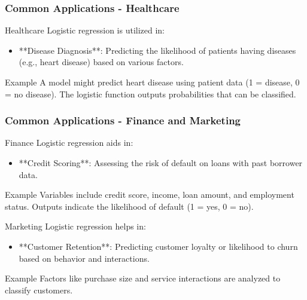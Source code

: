 \documentclass[aspectratio=169]{beamer}
\begin{document}
\begin{frame}[fragile]
    \frametitle{Common Applications - Healthcare}
    \begin{block}{Healthcare}
        Logistic regression is utilized in:
        \begin{itemize}
            \item **Disease Diagnosis**: Predicting the likelihood of patients having diseases (e.g., heart disease) based on various factors.
        \end{itemize}
        \begin{exampleblock}{Example}
            A model might predict heart disease using patient data (1 = disease, 0 = no disease).
            The logistic function outputs probabilities that can be classified.
        \end{exampleblock}
    \end{block}
\end{frame}

\begin{frame}[fragile]
    \frametitle{Common Applications - Finance and Marketing}
    \begin{block}{Finance}
        Logistic regression aids in:
        \begin{itemize}
            \item **Credit Scoring**: Assessing the risk of default on loans with past borrower data.
        \end{itemize}
        \begin{exampleblock}{Example}
            Variables include credit score, income, loan amount, and employment status.
            Outputs indicate the likelihood of default (1 = yes, 0 = no).
        \end{exampleblock}
    \end{block}
    
    \begin{block}{Marketing}
        Logistic regression helps in:
        \begin{itemize}
            \item **Customer Retention**: Predicting customer loyalty or likelihood to churn based on behavior and interactions.
        \end{itemize}
        \begin{exampleblock}{Example}
            Factors like purchase size and service interactions are analyzed to classify customers.
        \end{exampleblock}
    \end{block}
\end{frame}
\end{document}
